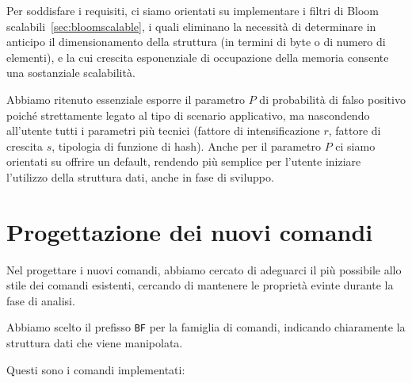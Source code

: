 Per soddisfare i requisiti, ci siamo orientati su implementare i {filtri di Bloom
scalabili}~\ref{sec:bloomscalable}, i quali eliminano la necessità di determinare in anticipo il
dimensionamento della struttura (in termini di byte o di numero di elementi), e la cui crescita
esponenziale di occupazione della memoria consente una sostanziale scalabilità.

Abbiamo ritenuto essenziale esporre il parametro $P$ di probabilità di falso positivo poiché
strettamente legato al tipo di scenario applicativo, ma nascondendo all'utente tutti i parametri più
tecnici (fattore di intensificazione $r$, fattore di crescita $s$, tipologia di funzione di hash).
Anche per il parametro $P$ ci siamo orientati su offrire un default, rendendo più semplice per
l'utente iniziare l'utilizzo della struttura dati, anche in fase di sviluppo.

\section{Progettazione dei nuovi comandi}

Nel progettare i nuovi comandi, abbiamo cercato di adeguarci il più possibile allo stile dei
comandi esistenti, cercando di mantenere le proprietà evinte durante la fase di analisi.

Abbiamo scelto il prefisso \verb|BF| per la famiglia di comandi, indicando chiaramente la
struttura dati che viene manipolata.

Questi sono i comandi implementati:


